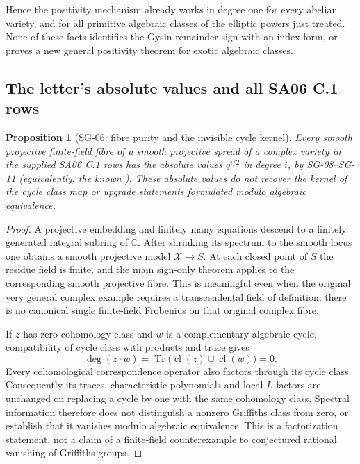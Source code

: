 \documentclass[11pt,a4paper]{article}
\newtheorem{proposition}[theorem]{Proposition}
\theoremstyle{remark}
\begin{document}
Hence the positivity mechanism already works in degree one for every abelian variety, and for all primitive algebraic classes of the elliptic powers just treated. None of these facts identifies the Gysin-remainder sign with an index form, or proves a new general positivity theorem for exotic algebraic classes.

\subsection{The letter's absolute values and all SA06 C.1 rows}

\begin{proposition}[SG-06: fibre purity and the invisible cycle kernel]
Every smooth projective finite-field fibre of a smooth projective spread of a complex variety in the supplied SA06 C.1 rows has the absolute values $q^{i/2}$ in degree $i$, by SG-08--SG-11 (equivalently, the known \cite[Th.~1.6]{WeilI}). These absolute values do not recover the kernel of the cycle class map or upgrade statements formulated modulo algebraic equivalence.
\end{proposition}

\begin{proof}
A projective embedding and finitely many equations descend to a finitely generated integral subring of $\mathbb C$. After shrinking its spectrum to the smooth locus one obtains a smooth projective model $\mathcal X\to S$. At each closed point of $S$ the residue field is finite, and the main sign-only theorem applies to the corresponding smooth projective fibre. This is meaningful even when the original very general complex example requires a transcendental field of definition; there is no canonical single finite-field Frobenius on that original complex fibre.

If $z$ has zero cohomology class and $w$ is a complementary algebraic cycle, compatibility of cycle class with products and trace gives
\[
 \deg(z\cdot w)=\operatorname{Tr}\bigl(\operatorname{cl}(z)\cup\operatorname{cl}(w)\bigr)=0.
\]
Every cohomological correspondence operator also factors through its cycle class. Consequently its traces, characteristic polynomials and local $L$-factors are unchanged on replacing a cycle by one with the same cohomology class. Spectral information therefore does not distinguish a nonzero Griffiths class from zero, or establish that it vanishes modulo algebraic equivalence. This is a factorization statement, not a claim of a finite-field counterexample to conjectured rational vanishing of Griffiths groups.
\end{proof}
\end{document}
